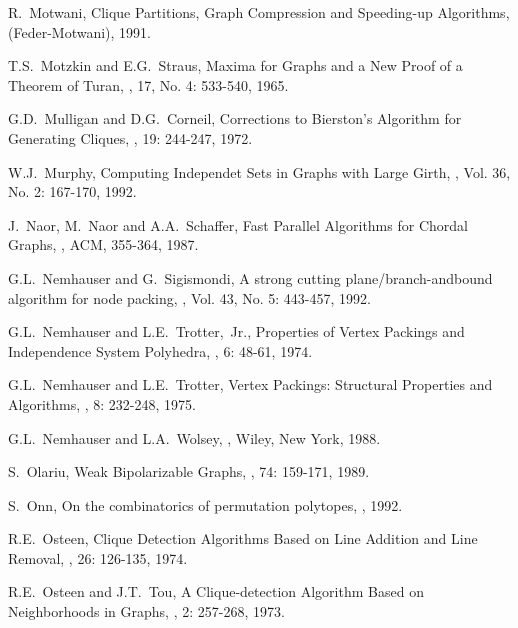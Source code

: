 \begin{thebibliography}{10}
R.~Motwani,
\newblock Clique Partitions, Graph Compression and Speeding-up
Algorithms,
 (Feder-Motwani), 1991.

T.S.~Motzkin and E.G.~Straus,
\newblock Maxima for Graphs and a New Proof of a Theorem of Turan,
, 17, No. 4: 533-540,
1965.

G.D.~Mulligan and D.G.~Corneil,
\newblock Corrections to Bierston's Algorithm for Generating Cliques,
, 19: 244-247, 1972.

W.J.~Murphy,
\newblock Computing Independet Sets in Graphs with Large Girth,
, Vol. 36, No. 2: 167-170,  
1992.

J.~Naor, M.~Naor and A.A.~Schaffer,
\newblock Fast Parallel Algorithms for Chordal Graphs,
,
ACM, 355-364, 1987.

G.L.~Nemhauser and G.~Sigismondi,
\newblock A strong cutting plane/branch-andbound algorithm for node
packing,
, Vol. 43, No. 5: 443-457, 1992.

G.L.~Nemhauser and L.E.~Trotter,~Jr.,
\newblock Properties of Vertex Packings and Independence System
Polyhedra,
, 6: 48-61, 1974.

G.L.~Nemhauser and L.E.~Trotter,
\newblock Vertex Packings: Structural Properties and Algorithms,
, 8: 232-248, 1975.

G.L.~Nemhauser and L.A.~Wolsey,
,
\newblock Wiley, New York, 1988.

S.~Olariu,
\newblock Weak Bipolarizable Graphs,
, 74: 159-171, 1989.

S.~Onn,
\newblock On the combinatorics of permutation polytopes,
, 1992.

R.E.~Osteen,
\newblock Clique Detection Algorithms Based on Line Addition and
Line Removal,
, 26: 126-135, 1974.

R.E.~Osteen and J.T.~Tou,
\newblock A Clique-detection Algorithm Based on Neighborhoods in
Graphs,
, 2: 257-268, 1973.


\end{thebibliography}
